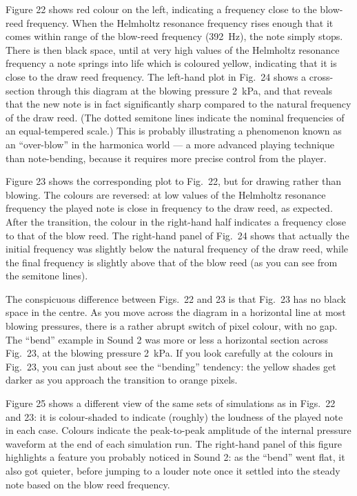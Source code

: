  Figure 22 shows red colour on the left, indicating a frequency close to the 
  blow-reed frequency. When the Helmholtz resonance frequency rises enough that 
  it comes within range of the blow-reed frequency (392~Hz), the note simply 
  stops. There is then black space, until at very high values of the Helmholtz 
  resonance frequency a note springs into life which is coloured yellow, 
  indicating that it is close to the draw reed frequency. The left-hand plot in 
  Fig.\ 24 shows a cross-section through this diagram at the blowing pressure 
  2~kPa, and that reveals that the new note is in fact significantly sharp 
  compared to the natural frequency of the draw reed. (The dotted semitone 
  lines indicate the nominal frequencies of an equal-tempered scale.) This is 
  probably illustrating a phenomenon known as an “over-blow” in the harmonica 
  world — a more advanced playing technique than note-bending, because it 
  requires more precise control from the player. 

  Figure 23 shows the corresponding plot to Fig.\ 22, but for drawing rather 
  than blowing. The colours are reversed: at low values of the Helmholtz 
  resonance frequency the played note is close in frequency to the draw reed, 
  as expected. After the transition, the colour in the right-hand half 
  indicates a frequency close to that of the blow reed. The right-hand panel of 
  Fig.\ 24 shows that actually the initial frequency was slightly below the 
  natural frequency of the draw reed, while the final frequency is slightly 
  above that of the blow reed (as you can see from the semitone lines). 

  The conspicuous difference between Figs.\ 22 and 23 is that Fig.\ 23 has no 
  black space in the centre. As you move across the diagram in a horizontal 
  line at most blowing pressures, there is a rather abrupt switch of pixel 
  colour, with no gap. The “bend” example in Sound 2 was more or less a 
  horizontal section across Fig.\ 23, at the blowing pressure 2~kPa. If you 
  look carefully at the colours in Fig.\ 23, you can just about see the 
  “bending” tendency: the yellow shades get darker as you approach the 
  transition to orange pixels. 

  Figure 25 shows a different view of the same sets of simulations as in Figs.\ 
  22 and 23: it is colour-shaded to indicate (roughly) the loudness of the 
  played note in each case. Colours indicate the peak-to-peak amplitude of the 
  internal pressure waveform at the end of each simulation run. The right-hand 
  panel of this figure highlights a feature you probably noticed in Sound 2: as 
  the “bend” went flat, it also got quieter, before jumping to a louder note 
  once it settled into the steady note based on the blow reed frequency. 

